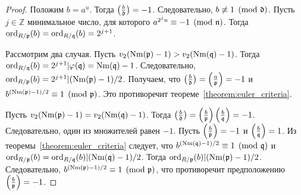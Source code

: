 \documentclass[_00_dissertation.tex]{subfiles}
\begin{document}
\begin{proof}
    Положим $b = a^u$.
    Тогда $\left(\frac{b}{\mathfrak{d}}\right) = -1$.
    Следовательно, $b \not\equiv 1 \pmod{\mathfrak{d}}$.
    Пусть $j \in \mathbb{Z}$ минимальное число, для которого $a^{2^j u} \equiv -1 \pmod{\mathfrak{n}}$.
    Тогда $\textrm{ord}_{R/\mathfrak{p}}(b) = \textrm{ord}_{R/\mathfrak{q}}(b) = 2^{j+1}$.
    
    Рассмотрим два случая.
    Пусть $v_2(\textrm{Nm}(\mathfrak{p}) - 1) > v_2(\textrm{Nm}(\mathfrak{q}) - 1)$.
    Тогда $\textrm{ord}_{R/\mathfrak{q}}(b) = 2^{j+1} | \varphi(\mathfrak{q}) = \textrm{Nm}(\mathfrak{q}) - 1$.
    Следовательно, $\textrm{ord}_{R/\mathfrak{p}}(b) = 2^{j+1} | (\textrm{Nm}(\mathfrak{p}) - 1)/2$.
    Получаем, что $\left(\frac{b}{\mathfrak{d}}\right) = \left(\frac{a}{\mathfrak{p}}\right) = -1$ и $b^{(\textrm{Nm}(\mathfrak{p}) - 1)/2} \equiv 1 \pmod{\mathfrak{p}}$.
    Это противоречит теореме~\ref{theorem:euler_criteria}.
    
    Пусть $v_2(\textrm{Nm}(\mathfrak{p}) - 1) = v_2(\textrm{Nm}(\mathfrak{q}) - 1)$.
    Тогда $\left(\frac{b}{\mathfrak{d}}\right) = \left(\frac{b}{\mathfrak{p}}\right)\left(\frac{b}{\mathfrak{q}}\right) = -1$.
    Следовательно, один из множителей равен $-1$.
    Пусть $\left(\frac{b}{\mathfrak{p}}\right) = -1$ и $\left(\frac{b}{\mathfrak{q}}\right) = 1$.
    Из теоремы~\ref{theorem:euler_criteria} следует, что $b^{(\textrm{Nm}(\mathfrak{q}) - 1)/2} \equiv 1 \pmod{\mathfrak{q}}$ и $\textrm{ord}_{R/\mathfrak{p}}(b) = \textrm{ord}_{R/\mathfrak{q}}(b) | (\textrm{Nm}(\mathfrak{q}) - 1)/2$.
    Тогда $\textrm{ord}_{R/\mathfrak{p}}(b) | (\textrm{Nm}(\mathfrak{p}) - 1)/2$.
    Следовательно, $b^{(\textrm{Nm}(\mathfrak{p}) - 1)/2} \equiv 1 \pmod{\mathfrak{p}}$, что противоречит предположению $\left(\frac{b}{\mathfrak{p}}\right) = -1$.
\end{proof}
\end{document}
